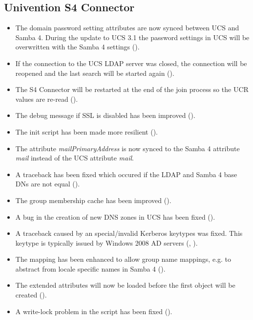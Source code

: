 \subsection{Univention S4 Connector}
\begin{itemize}
\item The domain password setting attributes are now synced between UCS and
Samba 4. During the update to UCS 3.1 the password settings in UCS will be
overwritten with the Samba 4 settings ().
\item If the connection to the UCS LDAP server was closed, the connection
will be reopened and the last search will be started again ().
\item The S4 Connector will be restarted at the end of the join process
so the UCR values are re-read ().
\item The debug message if SSL is disabled has been improved
().
\item The init script has been made more resilient ().
\item The attribute \emph{mailPrimaryAddress} is now synced to the
  Samba 4 attribute \emph{mail} instead of the UCS attribute \emph{mail}.
\item A traceback has been fixed which occured if the LDAP and Samba 4
  base DNs are not equal ().
\item The group membership cache has been improved ().
\item A bug in the creation of new DNS zones in UCS has been fixed
  ().
\item A traceback caused by an special/invalid Kerberos keytypes was
  fixed. This keytype is typically issued by Windows 2008 AD servers
  (, ).
\item The mapping has been enhanced to allow group name mappings,
  e.g. to abstract from locale specific names in Samba 4
  ().
\item The extended attributes will now be loaded before the first
  object will be created ().
\item A write-lock problem in the  script has been fixed ().
\end{itemize}

